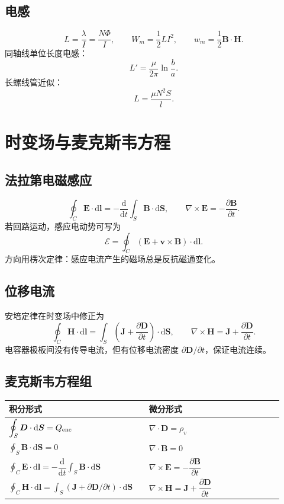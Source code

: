 \documentclass[11pt,a4paper]{ctexart}
\newcommand{\dd}{\mathrm{d}}
\newcommand{\E}{\bm E}
\newcommand{\D}{\bm D}
\newcommand{\B}{\bm B}
\newcommand{\Hf}{\bm H}
\newcommand{\J}{\bm J}
\newcommand{\curl}{\nabla\times}
\newcommand{\divg}{\nabla\cdot}
\begin{document}
\subsection{电感}
\[
L=\frac{\lambda}{I}=\frac{N\Phi}{I},\qquad
W_m=\frac12LI^2,\qquad
w_m=\frac12\B\cdot\Hf.
\]
同轴线单位长度电感：
\[
L'=\frac{\mu}{2\pi}\ln\frac{b}{a}.
\]
长螺线管近似：
\[
L=\frac{\mu N^2S}{l}.
\]

\section{时变场与麦克斯韦方程}
\subsection{法拉第电磁感应}
\[
\oint_C\E\cdot\dd\bm l=-\frac{\dd}{\dd t}\int_S\B\cdot\dd\bm S,\qquad
\curl\E=-\frac{\partial\B}{\partial t}.
\]
若回路运动，感应电动势可写为
\[
\mathcal E=\oint_C(\E+\bm v\times\B)\cdot\dd\bm l.
\]
方向用楞次定律：感应电流产生的磁场总是反抗磁通变化。

\subsection{位移电流}
安培定律在时变场中修正为
\[
\oint_C\Hf\cdot\dd\bm l=\int_S\left(\J+\frac{\partial\D}{\partial t}\right)\cdot\dd\bm S,
\qquad
\curl\Hf=\J+\frac{\partial\D}{\partial t}.
\]
电容器极板间没有传导电流，但有位移电流密度 $\partial\D/\partial t$，保证电流连续。

\subsection{麦克斯韦方程组}
\begin{longtable}{p{0.46\linewidth}p{0.46\linewidth}}
\toprule
积分形式 & 微分形式 \\
\midrule
$\displaystyle \oint_S\D\cdot\dd\bm S=Q_{\rm enc}$ &
$\displaystyle \divg\D=\rho_v$ \\
$\displaystyle \oint_S\B\cdot\dd\bm S=0$ &
$\displaystyle \divg\B=0$ \\
$\displaystyle \oint_C\E\cdot\dd\bm l=-\dfrac{\dd}{\dd t}\int_S\B\cdot\dd\bm S$ &
$\displaystyle \curl\E=-\dfrac{\partial\B}{\partial t}$ \\
$\displaystyle \oint_C\Hf\cdot\dd\bm l=\int_S(\J+\partial\D/\partial t)\cdot\dd\bm S$ &
$\displaystyle \curl\Hf=\J+\dfrac{\partial\D}{\partial t}$ \\
\bottomrule
\end{longtable}
\end{document}
